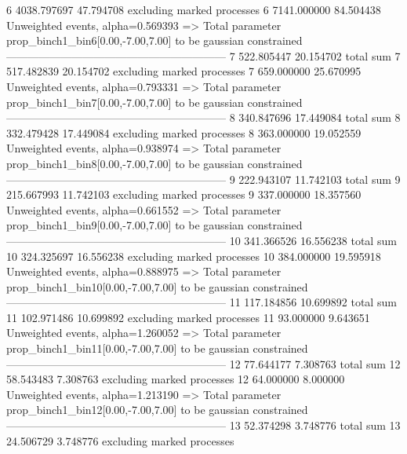 6          4038.797697     47.794708       excluding marked processes    
6          7141.000000     84.504438       Unweighted events, alpha=0.569393
  => Total parameter prop_binch1_bin6[0.00,-7.00,7.00] to be gaussian constrained
------------------------------------------------------------
7          522.805447      20.154702       total sum                     
7          517.482839      20.154702       excluding marked processes    
7          659.000000      25.670995       Unweighted events, alpha=0.793331
  => Total parameter prop_binch1_bin7[0.00,-7.00,7.00] to be gaussian constrained
------------------------------------------------------------
8          340.847696      17.449084       total sum                     
8          332.479428      17.449084       excluding marked processes    
8          363.000000      19.052559       Unweighted events, alpha=0.938974
  => Total parameter prop_binch1_bin8[0.00,-7.00,7.00] to be gaussian constrained
------------------------------------------------------------
9          222.943107      11.742103       total sum                     
9          215.667993      11.742103       excluding marked processes    
9          337.000000      18.357560       Unweighted events, alpha=0.661552
  => Total parameter prop_binch1_bin9[0.00,-7.00,7.00] to be gaussian constrained
------------------------------------------------------------
10         341.366526      16.556238       total sum                     
10         324.325697      16.556238       excluding marked processes    
10         384.000000      19.595918       Unweighted events, alpha=0.888975
  => Total parameter prop_binch1_bin10[0.00,-7.00,7.00] to be gaussian constrained
------------------------------------------------------------
11         117.184856      10.699892       total sum                     
11         102.971486      10.699892       excluding marked processes    
11         93.000000       9.643651        Unweighted events, alpha=1.260052
  => Total parameter prop_binch1_bin11[0.00,-7.00,7.00] to be gaussian constrained
------------------------------------------------------------
12         77.644177       7.308763        total sum                     
12         58.543483       7.308763        excluding marked processes    
12         64.000000       8.000000        Unweighted events, alpha=1.213190
  => Total parameter prop_binch1_bin12[0.00,-7.00,7.00] to be gaussian constrained
------------------------------------------------------------
13         52.374298       3.748776        total sum                     
13         24.506729       3.748776        excluding marked processes    
